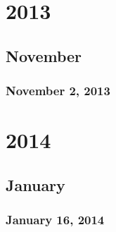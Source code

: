 \part{2013}
\chapter{November}
\section{November 2, 2013}

\part{2014}
\chapter{January}
\section{January 16, 2014}


